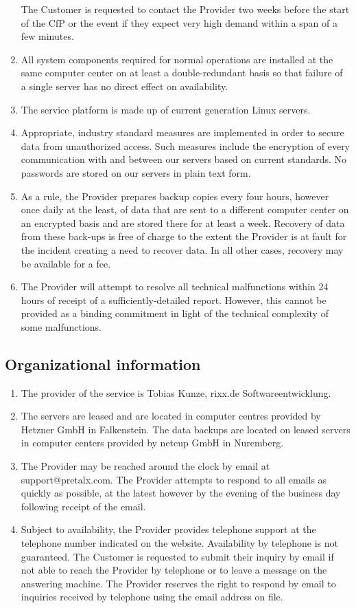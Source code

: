 \documentclass{terms}
\begin{document}
\begin{enumerate}
      The Customer is requested to contact the Provider two weeks before the start of the CfP or the event if they expect very high demand within a span of a few minutes.
\item All system components required for normal operations are installed at the same computer center on at least a double-redundant basis so that failure of a single server has no direct effect on availability.
\item The service platform is made up of current generation Linux servers.
\item Appropriate, industry standard measures are implemented in order to secure data from unauthorized access.
      Such measures include the encryption of every communication with and between our servers based on current standards.
      No passwords are stored on our servers in plain text form.
\item As a rule, the Provider prepares backup copies every four hours, however once daily at the least, of data that are sent to a different computer center on an encrypted basis and are stored there for at least a week.
      Recovery of data from these back-ups is free of charge to the extent the Provider is at fault for the incident creating a need to recover data.
      In all other cases, recovery may be available for a fee.
\item The Provider will attempt to resolve all technical malfunctions within 24 hours of receipt of a sufficiently-detailed report.
      However, this cannot be provided as a binding commitment in light of the technical complexity of some malfunctions.
\end{enumerate}

\subsection{Organizational information}
\begin{enumerate}
\item The provider of the service is Tobias Kunze, rixx.de Softwareentwicklung.
\item The servers are leased and are located in computer centres provided by Hetzner GmbH in Falkenstein.
      The data backups are located on leased servers in computer centers provided by netcup GmbH in Nuremberg.
\item The Provider may be reached around the clock by email at support@pretalx.com.
      The Provider attempts to respond to all emails as quickly as possible, at the latest however by the evening of the business day following receipt of the email.
\item Subject to availability, the Provider provides telephone support at the telephone number indicated on the website.
      Availability by telephone is not guaranteed.
      The Customer is requested to submit their inquiry by email if not able to reach the Provider by telephone or to leave a message on the answering machine.
      The Provider reserves the right to respond by email to inquiries received by telephone using the email address on file.
\end{enumerate}
\end{document}
